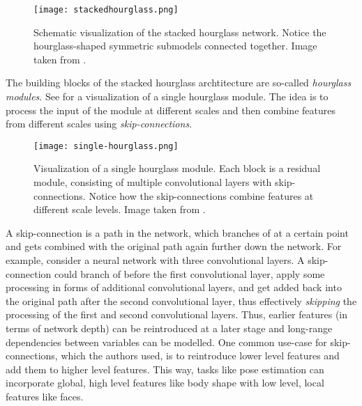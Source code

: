 \begin{figure}[htb!]
    \centering
    \texttt{[image: stackedhourglass.png]}
    \caption{Schematic visualization of the stacked hourglass network. Notice the hourglass-shaped symmetric submodels connected together. Image taken from \cite{newell_stacked_2016}. }
    \label{fig:stacked-hg-architecture}
\end{figure}

The building blocks of the stacked hourglass archtitecture are so-called \textit{hourglass modules}.
See  for a visualization of a single hourglass module.
The idea is to process the input of the module at different scales and then combine features from different scales using \textit{skip-connections}.

\begin{figure}[htb!]
    \centering
    \texttt{[image: single-hourglass.png]}
    \caption{Visualization of a single hourglass module. Each block is a residual module, consisting of multiple convolutional layers with skip-connections. Notice how the skip-connections combine features at different scale levels. Image taken from \cite{newell_stacked_2016}. }
    \label{fig:single-hourglass}
\end{figure}

A skip-connection is a path in the network, which branches of at a certain point and gets combined with the original path again further down the network.
For example, consider a neural network with three convolutional layers.
A skip-connection could branch of before the first convolutional layer, apply some processing in forms of additional convolutional layers, and get added back into the original path after the second convolutional layer, thus effectively \textit{skipping} the processing of the first and second convolutional layers.
Thus, earlier features (in terms of network depth) can be reintroduced at a later stage and long-range dependencies between variables can be modelled.
One common use-case for skip-connections, which the authors used, is to reintroduce lower level features and add them to higher level features.
This way, tasks like pose estimation can incorporate global, high level features like body shape with low level, local features like faces.

